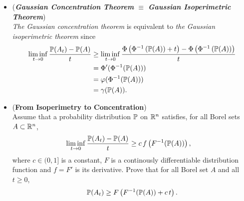 \documentclass[11pt]{article}
\begin{document}
\begin{itemize}
\begin{proof}
\begin{enumerate}
\item Now let A be \emph{any Borel set} with $\bP(A) > 0$. Let $0 < \epsilon < t$. Then by \textbf{\emph{Vitali's covering theorem}}, there exists a \emph{countable} collection of \emph{disjoint open balls} $\set{B_1, B_2, \ldots}$, all intersecting $A$ and \emph{diameter at most} $\epsilon$, such that $P(A - \bigcup_{n=1}^{\infty}B_n) = 0$. But then
\begin{align*}
\bP(A_t) &\ge \bP\paren{\bigcup_{n=1}^{\infty}(B_n)_{t - \epsilon}}\\
&= \lim\limits_{n \to \infty}\bP\paren{\bigcup_{i=1}^{n}(B_i)_{t - \epsilon}}\\
&\ge \lim\limits_{n \to \infty}\Phi\paren{\Phi^{-1}\paren{\bP\paren{\bigcup_{i=1}^{n}(B_i)_{t - \epsilon}}} + t - \epsilon}\\
&= \Phi\paren{\Phi^{-1}\paren{\bP\paren{\bigcup_{i=1}^{\infty}(B_i)_{t - \epsilon}}} + t - \epsilon}\\
&\ge \Phi\paren{\Phi^{-1}\paren{\bP\paren{A}} + t - \epsilon}
\end{align*} The argument is completed by taking $\epsilon$ to $0$. \qed
\end{enumerate}
\end{proof}

\item \begin{remark} (\emph{\textbf{Gaussian Concentration Theorem} $\equiv$ \textbf{Gaussian Isoperimetric Theorem}}) \\
\emph{The Gaussian concentration theorem} is equivalent to \emph{the Gaussian isoperimetric theorem} since
\begin{align*}
\liminf\limits_{t \to 0}\frac{{\mathbb P}(A_t) - {\mathbb P}(A)}{t} &\ge \liminf\limits_{t \to 0}\frac{\Phi\left(\Phi^{-1}\left({\mathbb P}(A)\right) + t\right) - \Phi\left(\Phi^{-1}\left({\mathbb P}(A)\right)\right)}{t} \\
&= \Phi'(\Phi^{-1}({\mathbb P}(A))) \\
&= \varphi(\Phi^{-1}({\mathbb P}(A))) \\
&= \gamma({\mathbb P}(A)).
\end{align*}
\end{remark}

\item \begin{exercise} (\textbf{From Isoperimetry to Concentration}) \citep{boucheron2013concentration}\\
Assume that a probability distribution ${\mathbb P}$ on ${\mathbb R}^n$ satisfies, for all Borel sets $A \subset {\mathbb R}^n$, 
\begin{align*}
\liminf\limits_{t \to 0}\frac{{\mathbb P}(A_t) - {\mathbb P}(A)}{t} &\ge c\,f\left(F^{-1}({\mathbb P}(A))\right),
\end{align*} where $c \in (0, 1]$ is a constant, $F$ is a continously differentiable distribution function and $f = F'$ is its derivative. Prove that for all Borel set $A$ and all $t \ge 0$, 
\begin{align*}
{\mathbb P}(A_t) \ge F\left(F^{-1}({\mathbb P}(A)) + c\,t\right).
\end{align*}
\end{exercise}


\end{itemize}
\end{document}

